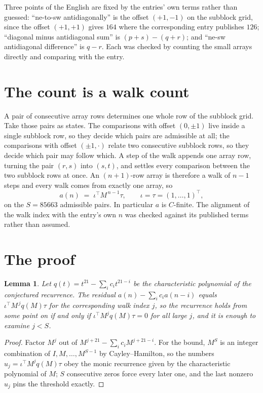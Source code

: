 \documentclass[11pt,a4paper]{article}
\theoremstyle{plain}
\newtheorem{lemma}[theorem]{Lemma}
\theoremstyle{definition}
\begin{document}
Three points of the English are fixed by the entries' own terms rather than guessed:
``ne-to-sw antidiagonally'' is the offset $(+1,-1)$ on the subblock grid, since the offset
$(+1,+1)$ gives $164$ where the corresponding entry publishes $126$; ``diagonal minus
antidiagonal sum'' is $(p+s)-(q+r)$; and ``ne-sw antidiagonal difference'' is $q-r$. Each was
checked by counting the small arrays directly and comparing with the entry.

\section{The count is a walk count}

A pair of consecutive array rows determines one whole row of the subblock grid. Take those
pairs as states. The comparisons with offset $(0,\pm1)$ live inside a single subblock row, so
they decide which pairs are admissible at all; the comparisons with offset $(\pm1,\cdot)$
relate two consecutive subblock rows, so they decide which pair may follow which. A step of the
walk appends one array row, turning the pair $(r,s)$ into $(s,t)$, and settles every comparison
between the two subblock rows at once. An $(n+1)$-row array is therefore a walk of $n-1$ steps
and every walk comes from exactly one array, so
\[
a(n)\;=\;\iota^{\!\top}M^{\,n-1}\tau,\qquad \iota=\tau=(1,\dots,1)^{\!\top},
\]
on the $S=85663$ admissible pairs. In particular $a$ is $C$-finite. The alignment of the walk
index with the entry's own $n$ was checked against its published terms rather than assumed.

\section{The proof}

\begin{lemma}\label{lem:crit}
Let $q(t)=t^{21}-\sum_i c_it^{21-i}$ be the characteristic polynomial of the
conjectured recurrence. The residual $a(n)-\sum_ic_ia(n-i)$ equals
$\iota^{\!\top}M^{\,j}q(M)\tau$ for the corresponding walk index $j$, so the recurrence
holds from some point on if and only if $\iota^{\!\top}M^{j}q(M)\tau=0$ for all large $j$,
and it is enough to examine $j<S$.
\end{lemma}

\begin{proof}
Factor $M^{j}$ out of $M^{j+21}-\sum_ic_iM^{j+21-i}$. For the bound, $M^{S}$
is an integer combination of $I,M,\dots,M^{S-1}$ by Cayley--Hamilton, so the numbers
$u_j=\iota^{\!\top}M^{j}q(M)\tau$ obey the monic recurrence given by the characteristic
polynomial of $M$; $S$ consecutive zeros force every later one, and the last nonzero $u_j$
pins the threshold exactly.
\end{proof}
\end{document}
